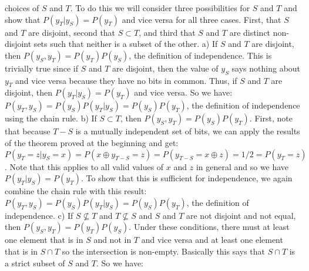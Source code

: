 \documentclass[12pt]{article}
\begin{document}
choices of $S$ and $T$. To do this we will consider three possibilities for $S$ and $T$ and show that
$P(y_T | y_S) = P(y_T)$ and vice versa for all three cases. First, that
$S$ and $T$ are disjoint, second that $S \subset T$, and third that $S$ and $T$ are distinct non-disjoint
sets such that neither is a subset of the other.
\newline
\newline
a) If $S$ and $T$ are disjoint, then $P(y_S, y_T) = P(y_T)P(y_S)$, the definition of independence.
\newline
\newline
This is trivially true since if $S$ and $T$ are disjoint, then the value of $y_S$ says nothing about $y_T$ and vice versa because
they have no bits in common. Thus, if $S$ and $T$ are disjoint, then $P(y_T | y_S) = P(y_T)$ and vice versa. So we have:
\newline
$P(y_T, y_S) = P(y_S)P(y_T | y_S) = P(y_S)P(y_T)$, the definition of independence using the chain rule.
\newline
\newline
b) If $S \subset T$, then $P(y_S, y_T) = P(y_S)P(y_T)$.
\newline
\newline
First, note that because $T-S$ is a mutually independent set of bits, we can apply the results of the theorem proved
at the beginning and get:
\newline
$P(y_T = z | y_S = x) = P(x \oplus y_{T-S} = z) = P(y_{T-S} = x \oplus z) = 1/2 = P(y_T = z)$.
\newline
Note that this applies to all valid values of $x$ and $z$ in general and so we have $P(y_T | y_S) = P(y_T)$. 
To show that this is sufficient for independence, we again combine the chain rule with this result:
\newline
$P(y_T, y_S) = P(y_S)P(y_T | y_S) = P(y_S)P(y_T)$, the definition of independence.
\newline
\newline
c) If $S \not\subseteq T$ and $T \not\subseteq S$ and $S$ and $T$ are not disjoint and not equal, 
then $P(y_S, y_T) = P(y_T)P(y_S)$.
\newline
\newline
Under these conditions, there must at least one element that is in $S$ and not in $T$ and vice versa and at least one element that
is in $S \cap T$ so the intersection is non-empty. Basically this says that $S \cap T$ is a strict subset of $S$ and $T$. So we have:
\newline
\end{document}
